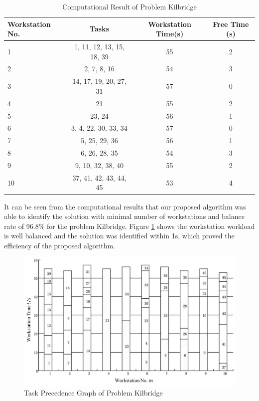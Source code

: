\begin{table}[h!]
	\begin{center}
		\caption{Computational Result of Problem Kilbridge}
		\label{tab:tab1}
		\begin{tabular}{l|c|c|c}
			\hline
			\textbf{Workstation No.} & \textbf{Tasks} & \textbf{Workstation Time(s)} & \textbf{Free Time (s)}\\
			\hline
			1 & 1, 11, 12, 13, 15, 18, 39 & 55 & 2\\
			\hline
			2 & 2, 7, 8, 16 & 54 & 3\\
			\hline
			3 & 14, 17, 19, 20, 27, 31 & 57 & 0\\
			\hline
			4 & 21 & 55 & 2 \\
			\hline
			5 & 23, 24 & 56 & 1 \\
			\hline
			6 & 3, 4, 22, 30, 33, 34 & 57 & 0 \\
			\hline
			7 & 5, 25, 29, 36 & 56 & 1\\
			\hline
			8 & 6, 26, 28, 35 & 54 & 3 \\
			\hline
			9 & 9, 10, 32, 38, 40 & 55 & 2\\
			\hline
			10 & 37, 41, 42, 43, 44, 45 & 53 & 4\\
			\hline
		\end{tabular}
	\end{center}
\end{table}

It can be seen from the computational results that our proposed algorithm was able to identify the solution with minimal number of workstations and balance rate of 96.8\% for the problem Kilbridge.
Figure \ref{fig:fig2} shows the workstation workload is well balanced and the solution was identified within 1s, which proved the efficiency of the proposed algorithm.



\begin{figure}[h!]
	\begin{center}
		\includegraphics[width=0.8\linewidth]{sections/figure2.png}
		\caption{Task Precedence Graph of Problem Kilbridge}
		\label{fig:fig2}
	\end{center}
\end{figure}


